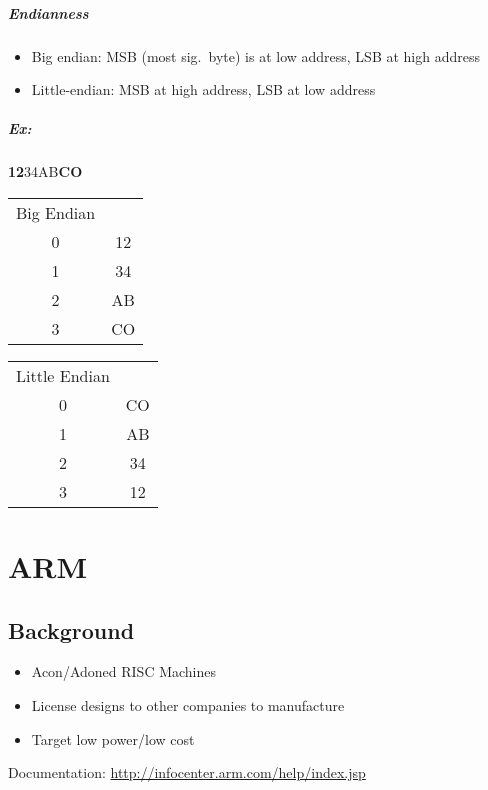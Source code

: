 \documentclass[12pt]{report}
\begin{document}
    \paragraph{Endianness}
    \begin{itemize}
      \item Big endian: MSB (most sig.\ byte) is at low address, LSB at high
      address
      \item Little-endian: MSB at high address, LSB at low address
    \end{itemize}
    \paragraph{Ex:} \textbf{12}34AB\textbf{CO}
    \begin{center}
      \begin{tabular}{c c}
        Big Endian &  \\
        0 & 12 \\
        1 & 34 \\
        2 & AB \\
        3 & CO \\
      \end{tabular}
      \begin{tabular}{c c}
        Little Endian & \\
        0 & CO \\
        1 & AB \\
        2 & 34 \\
        3 & 12 \\
      \end{tabular}
    \end{center}
\chapter{ARM}
  \section{Background}
    \begin{itemize}
      \item Acon/Adoned RISC Machines
      \item License designs to other companies to manufacture
      \item Target low power/low cost
    \end{itemize}
    Documentation:
    \url{http://infocenter.arm.com/help/index.jsp}
\end{document}

